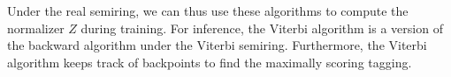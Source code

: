 Under the real semiring, we can thus use these algorithms to compute the
normalizer $Z$ during training. For inference, the Viterbi algorithm is a
version of the backward algorithm under the Viterbi semiring. Furthermore, the
Viterbi algorithm keeps track of backpoints to find the maximally scoring
tagging.
